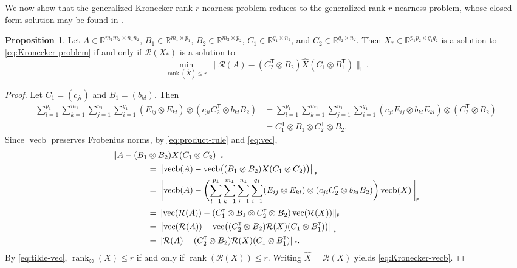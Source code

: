 \documentclass[11pt,reqno]{amsart}
\newcommand{\tp}{{\scriptscriptstyle\mathsf{T}}}
\newcommand{\F}{{\scriptscriptstyle\mathsf{F}}}
\DeclareMathOperator{\rank}{rank}
\DeclareMathOperator{\vecb}{vecb}
\DeclareMathOperator{\vect}{vec}
\theoremstyle{definition}
\newtheorem{proposition}[theorem]{Proposition}
\numberwithin{equation}{section}
\newcommand{\R}{\mathbb{R}}
\begin{document}
We now show that the generalized Kronecker rank-$r$ nearness problem reduces to the generalized rank-$r$ nearness problem, whose closed form solution may be found in \cite{Sondermann, Fri, li22}.
\begin{proposition}\label{prop:Kronecker-vecb}
Let $A \in \R^{m_1m_2 \times n_1n_2}$, $B_1 \in \R^{m_1 \times p_1}$, $B_2 \in \R^{m_2 \times p_2}$, $C_1 \in \R^{q_1 \times n_1}$, and $C_2 \in \R^{q_2 \times n_2}$. Then $X_* \in \R^{p_1p_2 \times q_1q_2}$ is a solution to \eqref{eq:Kronecker-problem} if and only if $\mathcal{R}(X_*)$ is a solution to 
\begin{equation} \label{eq:Kronecker-vecb}
    \min_{\rank(\widehat{X})\le r} \lVert \mathcal{R}(A)- (C_2^\tp \otimes B_2)\widehat{X}(C_1 \otimes B_1^\tp) \rVert_\F.
\end{equation}
\end{proposition}
\begin{proof}
Let $C_1 = (c_{ji})$ and $B_1 = (b_{kl})$. Then 
\begin{align*}
    \sum_{l=1}^{p_1}\sum_{k=1}^{m_1}\sum_{j=1}^{n_1}\sum_{i=1}^{q_1}(E_{ij} \otimes E_{kl}) \otimes (c_{ji}C_2^\tp \otimes b_{kl}B_2) &= \sum_{l=1}^{p_1}\sum_{k=1}^{m_1}\sum_{j=1}^{n_1}\sum_{i=1}^{q_1}(c_{ji}E_{ij} \otimes b_{kl}E_{kl}) \otimes (C_2^\tp \otimes B_2)\\
&= C_1^\tp \otimes B_1 \otimes C_2^\tp \otimes B_2.
\end{align*}
Since $\vecb$ preserves Frobenius norms, by \eqref{eq:product-rule} and \eqref{eq:vec},
\begin{align}
\lVert A- (B_1 &\otimes B_2) X(C_1 \otimes C_2)\rVert_\F \notag \\
    &= \bigl\lVert \vecb(A)- \vecb\bigl((B_1 \otimes B_2)X(C_1 \otimes C_2)\bigr)\bigr\rVert_\F \notag \\
    &=  \biggl\lVert \vecb(A)- \biggl(\sum_{l=1}^{p_1}\sum_{k=1}^{m_1}\sum_{j=1}^{n_1}\sum_{i=1}^{q_1}(E_{ij} \otimes E_{kl}) \otimes (c_{ji}C_2^\tp \otimes b_{kl}B_2) \biggr)\vecb(X)\biggr\rVert_\F \notag \\
    &= \lVert \vect(\mathcal{R}(A))- (C_1^\tp \otimes B_1 \otimes C_2^\tp \otimes B_2)\vect(\mathcal{R}(X))\rVert_\F \notag \\
    &= \bigl\lVert \vect(\mathcal{R}(A))- \vect\bigl((C_2^\tp \otimes B_2)\mathcal{R}(X)(C_1 \otimes B_1^\tp)\bigr) \bigr\rVert_\F \notag \\
    &= \lVert \mathcal{R}(A) - (C_2^\tp \otimes B_2)\mathcal{R}(X)(C_1 \otimes B_1^\tp)\rVert_\F. \label{eq:vecb-equiv}
\end{align}
By \eqref{eq:tilde-vec}, $\rank_\otimes(X) \le r $ if and only if $\rank(\mathcal{R}(X)) \le r$. Writing $\widehat{X} = \mathcal{R}(X)$ yields \eqref{eq:Kronecker-vecb}.
\end{proof}
\end{document}
